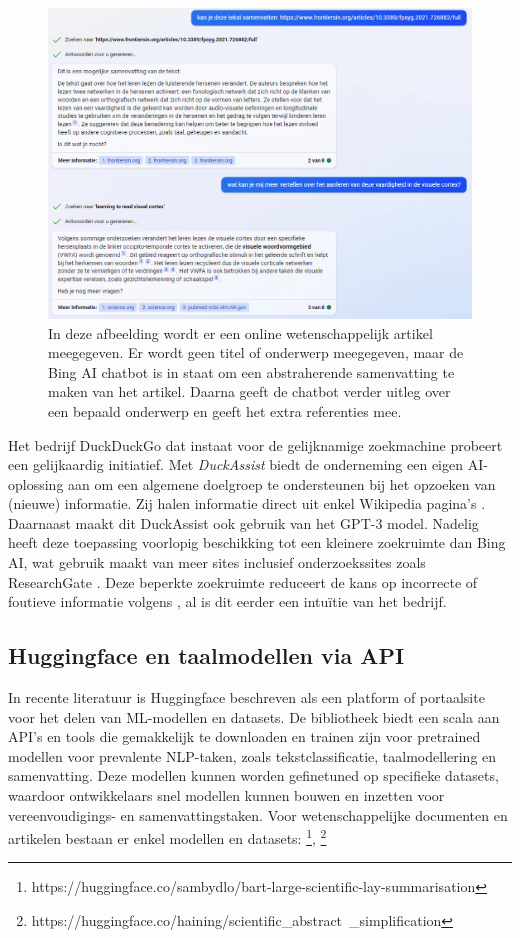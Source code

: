 \begin{figure}[H]
	\includegraphics{img/bing-ai-chatbot-example.png}
	\caption{In deze afbeelding wordt er een online wetenschappelijk artikel meegegeven. Er wordt geen titel of onderwerp meegegeven, maar de Bing AI chatbot is in staat om een abstraherende samenvatting te maken van het artikel. Daarna geeft de chatbot verder uitleg over een bepaald onderwerp en geeft het extra referenties mee.}
\end{figure}

Het bedrijf DuckDuckGo dat instaat voor de gelijknamige zoekmachine probeert een gelijkaardig initiatief. Met \textit{DuckAssist} biedt de onderneming een eigen AI-oplossing aan om een algemene doelgroep te ondersteunen bij het opzoeken van (nieuwe) informatie. Zij halen informatie direct uit enkel Wikipedia pagina's \autocite{Weinberg2023}. Daarnaast maakt dit DuckAssist ook gebruik van het GPT-3 model. Nadelig heeft deze toepassing voorlopig beschikking tot een kleinere zoekruimte dan Bing AI, wat gebruik maakt van meer sites inclusief onderzoekssites zoals ResearchGate \autocite{Mcauliffe2023}. Deze beperkte zoekruimte reduceert de kans op incorrecte of foutieve informatie volgens \textcite{Weinberg2023}, al is dit eerder een intuïtie van het bedrijf.


\subsection{Huggingface en taalmodellen via API}

In recente literatuur is Huggingface beschreven als een platform of portaalsite voor het delen van ML-modellen en datasets. De bibliotheek biedt een scala aan API's en tools die gemakkelijk te downloaden en trainen zijn voor pretrained modellen voor prevalente NLP-taken, zoals tekstclassificatie, taalmodellering en samenvatting. Deze modellen kunnen worden gefinetuned op specifieke datasets, waardoor ontwikkelaars snel modellen kunnen bouwen en inzetten voor vereenvoudigings- en samenvattingstaken. Voor wetenschappelijke documenten en artikelen bestaan er enkel modellen en datasets: \footnote{https://huggingface.co/sambydlo/bart-large-scientific-lay-summarisation}, \footnote{https://huggingface.co/haining/scientific\_abstract\	_simplification}

